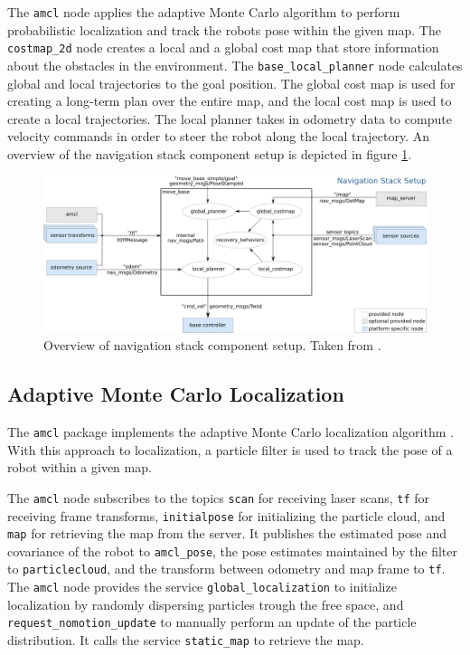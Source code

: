 \documentclass[10pt,journal,compsoc]{IEEEtran}
\begin{document}
The \texttt{amcl} node applies the adaptive Monte Carlo algorithm  to perform probabilistic localization and track the robots pose within the given map. The \texttt{costmap\_2d} node creates a local and a global cost map that store information about the obstacles in the environment. The \texttt{base\_local\_planner} node calculates global and local trajectories to the goal position. The global cost map is used for creating a long-term plan over the entire map, and the local cost map is used to create a local trajectories. The local planner takes in odometry data to compute velocity commands in order to steer the robot along the local trajectory. An overview of the navigation stack component setup is depicted in figure \ref{fig:overview_navigation_stack}.
\begin{figure}[thpb]
      \centering
      \includegraphics[width=\textwidth]{images/overview_tf.png}
      \caption{Overview of navigation stack component setup. Taken from  \cite{ros_wiki_nav_stack}.}
      \label{fig:overview_navigation_stack}
\end{figure}

\subsection{Adaptive Monte Carlo Localization}
The \texttt{amcl} package implements the adaptive Monte Carlo localization algorithm \cite{ros_wiki_amcl}. With this approach to localization, a particle filter is used to track the pose of a robot within a given map.

The \texttt{amcl} node subscribes to the topics \texttt{scan} for receiving laser scans, \texttt{tf} for receiving frame transforms, \texttt{initialpose} for initializing the particle cloud, and \texttt{map} for retrieving the map from the server. It publishes the estimated pose and covariance of the robot to \texttt{amcl\_pose}, the pose estimates maintained by the filter to \texttt{particlecloud}, and the transform between odometry and map frame to \texttt{tf}. The \texttt{amcl} node provides the service \texttt{global\_localization} to initialize localization by randomly dispersing particles trough the free space, and \texttt{request\_nomotion\_update} to manually perform an update of the particle distribution. It calls the service \texttt{static\_map} to retrieve the map.
\end{document}
